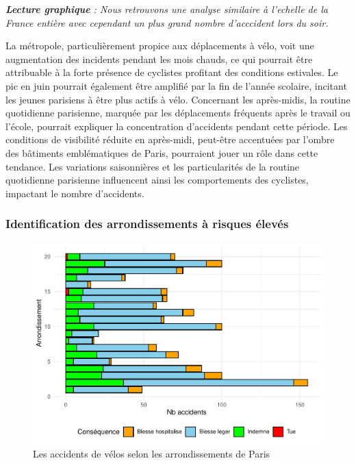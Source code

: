 \documentclass[french,]{compterendu}
\theoremstyle{urcastyle}
\theoremstyle{remark}
\begin{document}
\emph{\textbf{Lecture graphique} : Nous retrouvons une analyse similaire à l'echelle de la France entière avec cependant un plus grand nombre d'acccident lors du soir.}

La métropole, particulièrement propice aux déplacements à vélo, voit une augmentation des incidents pendant les mois chauds, ce qui pourrait être attribuable à la forte présence de cyclistes profitant des conditions estivales. Le pic en juin pourrait également être amplifié par la fin de l'année scolaire, incitant les jeunes parisiens à être plus actifs à vélo.
Concernant les après-midis, la routine quotidienne parisienne, marquée par les déplacements fréquents après le travail ou l'école, pourrait expliquer la concentration d'accidents pendant cette période. Les conditions de visibilité réduite en après-midi, peut-être accentuées par l'ombre des bâtiments emblématiques de Paris, pourraient jouer un rôle dans cette tendance.
Les variations saisonnières et les particularités de la routine quotidienne parisienne influencent ainsi les comportements des cyclistes, impactant le nombre d'accidents.

\hypertarget{identification-des-arrondissements-uxe0-risques-uxe9levuxe9s}{%
\subsubsection{Identification des arrondissements à risques élevés}\label{identification-des-arrondissements-uxe0-risques-uxe9levuxe9s}}

\begin{figure}[H]

{\centering \includegraphics[width=0.9\linewidth]{Rapport_ADD_LEO-GABET_files/figure-latex/arrPARISaccident-1} 

}

\caption{Les accidents de vélos selon les arrondissements de Paris}\label{fig:arrPARISaccident}
\end{figure}
\end{document}
